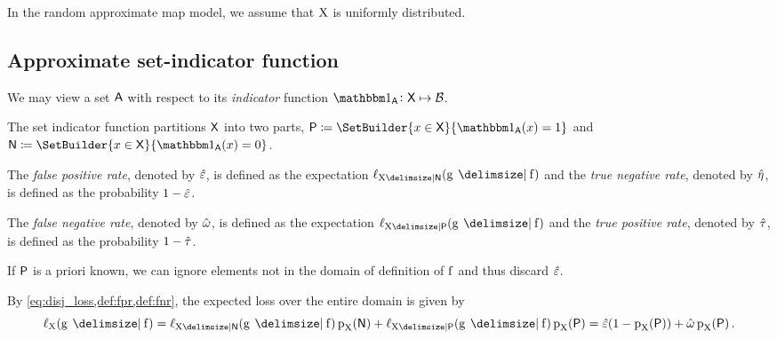 \documentclass[11pt,final,hidelinks]{article}
\begin{document}
In the random approximate map model, we assume that $\mathrm{X}$ is uniformly distributed.


\subsection{Approximate set-indicator function}
We may view a set $\Set{A}$ with respect to its \emph{indicator} function $\SetIndicator{\Set{A}} \colon \Set{X} \mapsto \BitSet$.

The set indicator function partitions $\Set{X}$ into two parts, $\PlainSet{P} \coloneqq \SetBuilder{x \in \Set{X}}{\SetIndicator{\Set{A}}(x) = 1}$ and $\PlainSet{N} \coloneqq \SetBuilder{x \in \Set{X}}{\SetIndicator{\Set{A}}(x) = 0}$.




\begin{definition}
\label{def:fpr}
The \emph{false positive rate}, denoted by $\hat{\varepsilon}$, is defined as the expectation $\Fun{\ell}_{\RV{X} \Given \PlainSet{N}}(\Fun{g} \Given \Fun{f})$ and the \emph{true negative rate}, denoted by $\hat{\eta}$, is defined as the probability $1-\hat{\varepsilon}$.
\end{definition}

\begin{definition}
	\label{def:fnr}
	The \emph{false negative rate}, denoted by $\hat{\omega}$, is defined as the expectation $\Fun{\ell}_{\RV{X} \Given \PlainSet{P}}(\Fun{g} \Given \Fun{f})$ and the \emph{true positive rate}, denoted by $\hat{\tau}$, is defined as the probability $1-\hat{\tau}$.
\end{definition}

\begin{remark}
	If $\PlainSet{P}$ is a priori known, we can ignore elements not in the domain of definition of $\Fun{f}$ and thus discard $\hat{\varepsilon}$.
\end{remark}


By \cref{eq:disj_loss,def:fpr,def:fnr}, the expected loss over the entire domain is given by
\begin{equation}
\Fun{\ell}_{\RV{X}}(\Fun{g} \Given \Fun{f}) = \Fun{\ell}_{\RV{X} \Given \PlainSet{N}}(\Fun{g} \Given \Fun{f}) \Fun{p}_{\RV{X}}(\PlainSet{N}) + \Fun{\ell}_{\RV{X} \Given \PlainSet{P}}(\Fun{g} \Given \Fun{f}) \Fun{p}_{\RV{X}}(\PlainSet{P}) = \hat{\fprate} (1-\Fun{p}_{\RV{X}}(\PlainSet{P})) + \hat{\fnrate} \Fun{p}_{\RV{X}}(\PlainSet{P})\,.
\end{equation}
\end{document}

